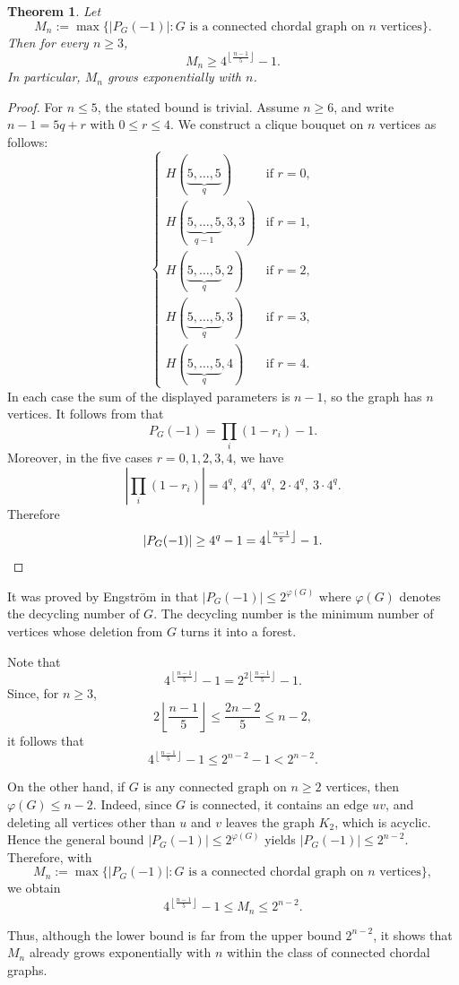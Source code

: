 \documentclass[12pt]{amsart}
\theoremstyle{plain}
\newtheorem{thm}{Theorem}[section]
\theoremstyle{definition}
\begin{document}
\begin{thm}\label{thm:chordal_exponential}
Let
\[
M_n:=\max\{ |P_G(-1)| : G \text{ is a connected chordal graph on } n \text{ vertices} \}.
\]
Then for every \(n\geq 3\),
\[
M_n\geq 4^{\left\lfloor \frac{n-1}{5}\right\rfloor}-1.
\]
In particular, \(M_n\) grows exponentially with \(n\).
\end{thm}

\begin{proof}
For \(n\leq 5\), the stated bound is trivial. Assume \(n\geq 6\), and write $n-1=5q+r$ with  $0\leq r\leq 4$. We construct a clique bouquet on \(n\) vertices as follows:
\[
\begin{cases}
H(\underbrace{5,\dots,5}_{q}) & \text{if } r=0,\\[4pt]
H(\underbrace{5,\dots,5}_{q-1},3,3) & \text{if } r=1,\\[4pt]
H(\underbrace{5,\dots,5}_{q},2) & \text{if } r=2,\\[4pt]
H(\underbrace{5,\dots,5}_{q},3) & \text{if } r=3,\\[4pt]
H(\underbrace{5,\dots,5}_{q},4) & \text{if } r=4.
\end{cases}
\]
In each case the sum of the displayed parameters is \(n-1\), so the graph has \(n\)
vertices. It follows from   that
\[
P_G(-1)=\prod_i (1-r_i)-1.
\]
Moreover, in the five cases \(r=0,1,2,3,4\), we have
\[
\left|\prod_i (1-r_i)\right|
=
4^q,\ 4^q,\ 4^q,\ 2\cdot 4^q,\ 3\cdot 4^q.
\]
Therefore
\[
|P_G(-1)|
\geq 4^q-1
=
4^{\left\lfloor \frac{n-1}{5}\right\rfloor}-1. \qedhere
\]
\end{proof}

\begin{remark}
It was proved by Engström in \cite[
Corollary 3.2]{Upper_bound_engstrom} that $|P_G(-1)|\leq 2^{\varphi (G)}$ where 
\(\varphi(G)\) denotes the decycling number of \(G\). The decycling number is the  minimum number of vertices whose deletion from $G$ turns it into a forest.

Note that  
\[
4^{\left\lfloor \frac{n-1}{5}\right\rfloor}-1
=2^{ 2\left\lfloor \frac{n-1}{5}\right\rfloor}-1.
\]
Since, for $n\ge 3$,
\[
2\left\lfloor \frac{n-1}{5}\right\rfloor
\le \frac{2n-2}{5}
\le n-2,
\]
it follows that
\[
4^{\left\lfloor \frac{n-1}{5}\right\rfloor}-1
\le 2^{n-2}-1
< 2^{n-2}.
\]

On the other hand, if \(G\) is any connected graph on \(n\ge 2\) vertices, then $\varphi(G)\le n-2$. Indeed, since \(G\) is connected, it contains an edge \(uv\), and deleting all vertices other than \(u\) and \(v\) leaves the graph \(K_2\), which is acyclic. Hence the general bound $|P_G(-1)|\le 2^{\varphi(G)}$
yields $|P_G(-1)|\le 2^{n-2}$.
Therefore, with
\[
M_n:=\max\{ |P_G(-1)| : G \text{ is a connected chordal graph on } n \text{ vertices} \},
\]
we obtain
\[
4^{\left\lfloor \frac{n-1}{5}\right\rfloor}-1
\le M_n
\le 2^{n-2}.
\]

Thus, although the lower bound is far from the  upper bound \(2^{n-2}\), it shows that \(M_n\) already grows exponentially with \(n\) within the class of connected chordal graphs. 
\end{remark}






\end{document}
